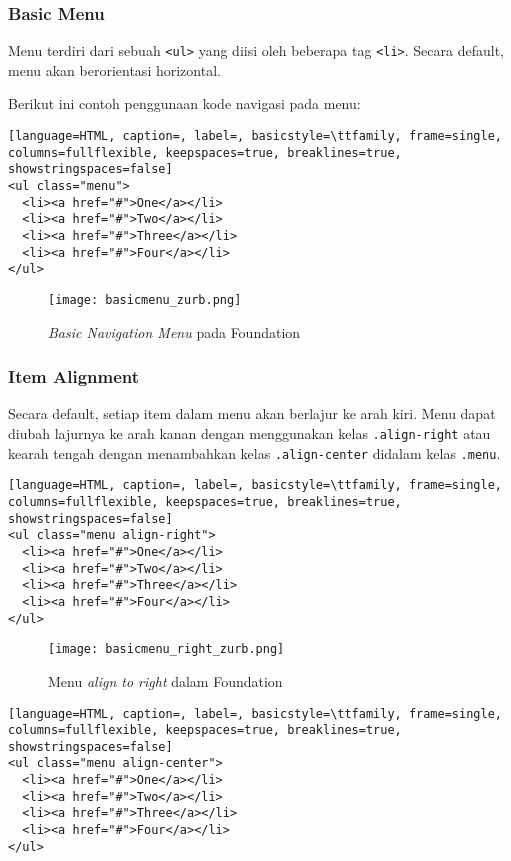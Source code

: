 \subsubsection{Basic Menu}

Menu terdiri dari sebuah \texttt{<ul>} yang diisi oleh beberapa tag \texttt{<li>}. Secara default, menu akan berorientasi horizontal.

Berikut ini contoh penggunaan kode navigasi pada menu:

\begin{lstlisting}[language=HTML, caption=, label=, basicstyle=\ttfamily, frame=single, columns=fullflexible, keepspaces=true, breaklines=true, showstringspaces=false] 
<ul class="menu">
  <li><a href="#">One</a></li>
  <li><a href="#">Two</a></li>
  <li><a href="#">Three</a></li>
  <li><a href="#">Four</a></li>
</ul>
\end{lstlisting}

\begin{figure} [H]  
    \centering  
	\texttt{[image: basicmenu\_zurb.png]}  
	\caption{\textit{Basic Navigation Menu} pada Foundation}
\end{figure}

\subsubsection{Item Alignment}
Secara default, setiap item dalam menu akan berlajur ke arah kiri. Menu dapat diubah lajurnya ke arah kanan dengan menggunakan kelas \texttt{.align-right} atau kearah tengah dengan menambahkan kelas \texttt{.align-center} didalam kelas \texttt{.menu}.
\begin{lstlisting}[language=HTML, caption=, label=, basicstyle=\ttfamily, frame=single, columns=fullflexible, keepspaces=true, breaklines=true, showstringspaces=false] 
<ul class="menu align-right">
  <li><a href="#">One</a></li>
  <li><a href="#">Two</a></li>
  <li><a href="#">Three</a></li>
  <li><a href="#">Four</a></li>
</ul>
\end{lstlisting}

\begin{figure}[H]
	\centering  
	\texttt{[image: basicmenu\_right\_zurb.png]}  
	\caption{Menu \textit{align to right} dalam Foundation}
\end{figure}

\begin{lstlisting}[language=HTML, caption=, label=, basicstyle=\ttfamily, frame=single, columns=fullflexible, keepspaces=true, breaklines=true, showstringspaces=false] 
<ul class="menu align-center">
  <li><a href="#">One</a></li>
  <li><a href="#">Two</a></li>
  <li><a href="#">Three</a></li>
  <li><a href="#">Four</a></li>
</ul>
\end{lstlisting}


